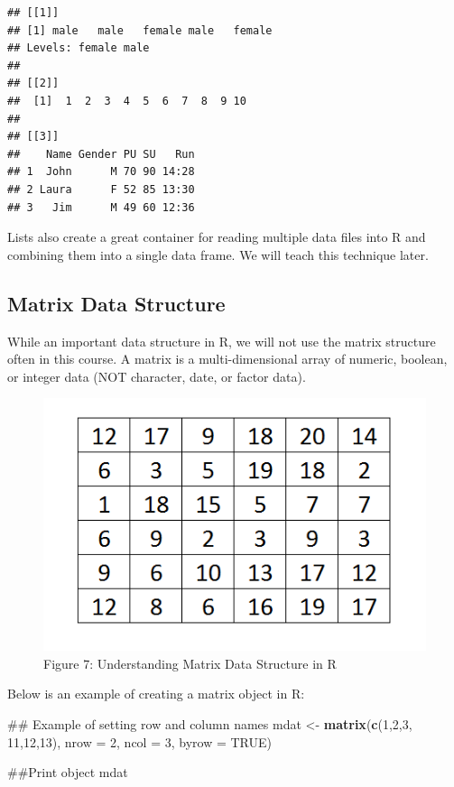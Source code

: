 \documentclass[]{book}
\newenvironment{Shaded}{\begin{snugshade}}{\end{snugshade}}
\newcommand{\KeywordTok}[1]{\textcolor[rgb]{0.13,0.29,0.53}{\textbf{{#1}}}}
\newcommand{\DataTypeTok}[1]{\textcolor[rgb]{0.13,0.29,0.53}{{#1}}}
\newcommand{\DecValTok}[1]{\textcolor[rgb]{0.00,0.00,0.81}{{#1}}}
\newcommand{\StringTok}[1]{\textcolor[rgb]{0.31,0.60,0.02}{{#1}}}
\newcommand{\OtherTok}[1]{\textcolor[rgb]{0.56,0.35,0.01}{{#1}}}
\newcommand{\NormalTok}[1]{{#1}}
\begin{document}
\begin{verbatim}
## [[1]]
## [1] male   male   female male   female
## Levels: female male
## 
## [[2]]
##  [1]  1  2  3  4  5  6  7  8  9 10
## 
## [[3]]
##    Name Gender PU SU   Run
## 1  John      M 70 90 14:28
## 2 Laura      F 52 85 13:30
## 3   Jim      M 49 60 12:36
\end{verbatim}

Lists also create a great container for reading multiple data files into
R and combining them into a single data frame. We will teach this
technique later.

\subsection{Matrix Data Structure}\label{matrix-data-structure}

While an important data structure in R, we will not use the matrix
structure often in this course. A matrix is a multi-dimensional array of
numeric, boolean, or integer data (NOT character, date, or factor data).

\begin{figure}[htbp]
\centering
\includegraphics{matrix.PNG}
\caption{Figure 7: Understanding Matrix Data Structure in R}
\end{figure}

Below is an example of creating a matrix object in R:

\begin{Shaded}
\begin{Highlighting}[]
\NormalTok{## Example of setting row and column names}
\NormalTok{mdat <-}\StringTok{ }\KeywordTok{matrix}\NormalTok{(}\KeywordTok{c}\NormalTok{(}\DecValTok{1}\NormalTok{,}\DecValTok{2}\NormalTok{,}\DecValTok{3}\NormalTok{, }\DecValTok{11}\NormalTok{,}\DecValTok{12}\NormalTok{,}\DecValTok{13}\NormalTok{), }\DataTypeTok{nrow =} \DecValTok{2}\NormalTok{, }\DataTypeTok{ncol =} \DecValTok{3}\NormalTok{, }\DataTypeTok{byrow =} \OtherTok{TRUE}\NormalTok{)}

\NormalTok{##Print object}
\NormalTok{mdat}
\end{Highlighting}
\end{Shaded}
\end{document}
